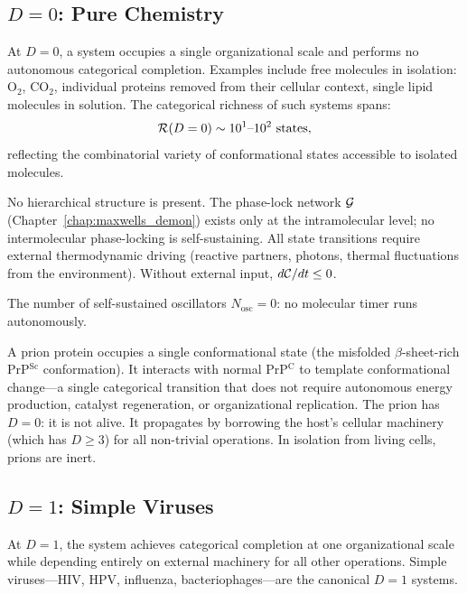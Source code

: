 \subsection{$D = 0$: Pure Chemistry}

At $D = 0$, a system occupies a single organizational scale and performs no
autonomous categorical completion. Examples include free molecules in isolation:
$\mathrm{O_2}$, $\mathrm{CO_2}$, individual proteins removed from their
cellular context, single lipid molecules in solution. The categorical richness
of such systems spans:
\begin{equation}
  \mathcal{R}(D=0) \sim 10^1\text{--}10^2 \text{ states},
  \label{eq:richness_D0}
\end{equation}
reflecting the combinatorial variety of conformational states accessible to
isolated molecules.

No hierarchical structure is present. The phase-lock network
$\mathcal{G}$ (Chapter~\ref{chap:maxwells_demon}) exists only at the
intramolecular level; no intermolecular phase-locking is self-sustaining. All
state transitions require external thermodynamic driving (reactive partners,
photons, thermal fluctuations from the environment). Without external input,
$d\mathcal{C}/dt \leq 0$.

The number of self-sustained oscillators $N_{\mathrm{osc}} = 0$: no molecular
timer runs autonomously.

\begin{example}[Prion as $D = 0$ System]
\label{ex:prion}
A prion protein occupies a single conformational state (the misfolded
$\beta$-sheet-rich PrP$^\mathrm{Sc}$ conformation). It interacts with normal
PrP$^\mathrm{C}$ to template conformational change---a single categorical
transition that does not require autonomous energy production, catalyst
regeneration, or organizational replication. The prion has $D = 0$: it is not
alive. It propagates by borrowing the host's cellular machinery (which has
$D \geq 3$) for all non-trivial operations. In isolation from living cells,
prions are inert.
\end{example}

\subsection{$D = 1$: Simple Viruses}

At $D = 1$, the system achieves categorical completion at one organizational
scale while depending entirely on external machinery for all other operations.
Simple viruses---HIV, HPV, influenza, bacteriophages---are the canonical $D = 1$
systems.

